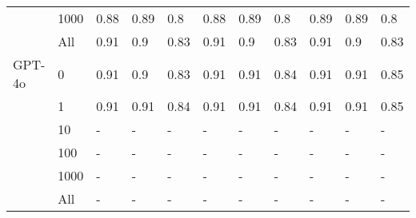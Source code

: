 \begin{table}
\begin{tabular}[t]{llll>{}l|ll>{}l|lll}
 & 1000 & 0.88 & 0.89 & 0.8 & 0.88 & 0.89 & 0.8 & 0.89 & 0.89 & 0.8\\

 & All & 0.91 & 0.9 & 0.83 & 0.91 & 0.9 & 0.83 & 0.91 & 0.9 & 0.83\\
\cmidrule{1-11}
GPT-4o & 0 & 0.91 & 0.9 & 0.83 & 0.91 & 0.91 & 0.84 & 0.91 & 0.91 & 0.85\\

 & 1 & 0.91 & 0.91 & 0.84 & 0.91 & 0.91 & 0.84 & 0.91 & 0.91 & 0.85\\

 & 10 & - & - & - & - & - & - & - & - & -\\

 & 100 & - & - & - & - & - & - & - & - & -\\

 & 1000 & - & - & - & - & - & - & - & - & -\\

 & All & - & - & - & - & - & - & - & - & -\\
\bottomrule
\end{tabular}
\endgroup{}
\end{table}